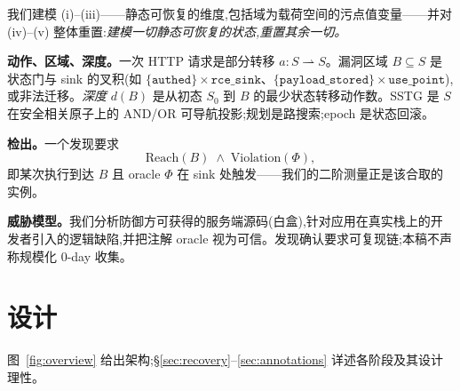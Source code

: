 \documentclass[letterpaper,twocolumn,10pt]{article}
\begin{document}
我们建模 (i)--(iii)——静态可恢复的维度,包括域为载荷空间的污点值变量——并对 (iv)--(v) 整体重置:\emph{建模一切静态可恢复的状态,重置其余一切。}

\textbf{动作、区域、深度。}一次 HTTP 请求是部分转移 $a: S \rightharpoonup S$。漏洞区域 $B \subseteq S$ 是状态门与 sink 的叉积(如 $\{\texttt{authed}\}\times\texttt{rce\_sink}$、$\{\texttt{payload\_stored}\}\times\texttt{use\_point}$),或非法迁移。\emph{深度} $d(B)$ 是从初态 $S_0$ 到 $B$ 的最少状态转移动作数。SSTG 是 $S$ 在安全相关原子上的 AND/OR 可导航投影;规划是路搜索;epoch 是状态回滚。

\textbf{检出。}一个发现要求
\begin{equation}
\mathrm{Reach}(B) \;\wedge\; \mathrm{Violation}(\Phi),
\end{equation}
即某次执行到达 $B$ 且 oracle $\Phi$ 在 sink 处触发——我们的二阶测量正是该合取的实例。

\textbf{威胁模型。}我们分析防御方可获得的服务端源码(白盒),针对应用在真实栈上的开发者引入的逻辑缺陷,并把注解 oracle 视为可信。发现确认要求可复现链;本稿不声称规模化 0-day 收集。

\section{设计}
\label{sec:design}

图~\ref{fig:overview} 给出架构;\S\ref{sec:recovery}--\ref{sec:annotations} 详述各阶段及其设计理性。
\end{document}
